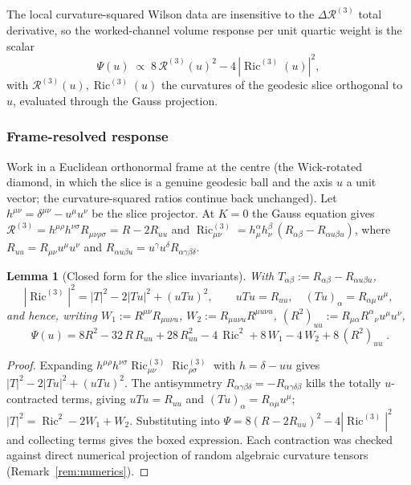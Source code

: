 \documentclass[11pt]{article}
\newtheorem{lemma}[theorem]{Lemma}
\theoremstyle{definition}
\theoremstyle{remark}
\newcommand{\Ric}{\operatorname{Ric}}
\newcommand{\Ruu}{R_{uu}}
\newcommand{\Rth}{\mathcal R^{(3)}}
\begin{document}
The local curvature-squared Wilson data are insensitive to the $\Delta\Rth$ total
derivative, so the worked-channel volume response per unit quartic weight is the
scalar
\begin{equation}
\label{eq:psi-def}
 \Psi(u)\;\propto\;8\,\Rth(u)^2-4\,|\Ric^{(3)}(u)|^2,
\end{equation}
with $\Rth(u),\Ric^{(3)}(u)$ the curvatures of the geodesic slice orthogonal to
$u$, evaluated through the Gauss projection.

\subsubsection{Frame-resolved response}
\label{subsec:worked-frame}

Work in a Euclidean orthonormal frame at the centre (the Wick-rotated diamond, in
which the slice is a genuine geodesic ball and the axis $u$ a unit vector; the
curvature-squared ratios continue back unchanged).  Let
$h^{\mu\nu}=\delta^{\mu\nu}-u^\mu u^\nu$ be the slice projector.  At $K=0$ the Gauss
equation gives $\Rth=h^{\mu\rho}h^{\nu\sigma}R_{\mu\nu\rho\sigma}=R-2\Ruu$ and
$\Ric^{(3)}_{\mu\nu}=h_\mu^\alpha h_\nu^\beta\,(R_{\alpha\beta}-R_{\alpha u\beta u})$,
where $\Ruu=R_{\mu\nu}u^\mu u^\nu$ and $R_{\alpha u\beta u}=u^\gamma u^\delta
R_{\alpha\gamma\beta\delta}$.

\begin{lemma}[Closed form for the slice invariants]
\label{lem:slice-closed}
With $T_{\alpha\beta}:=R_{\alpha\beta}-R_{\alpha u\beta u}$,
\[
 |\Ric^{(3)}|^2=|T|^2-2|Tu|^2+(uTu)^2,
 \qquad uTu=\Ruu,\quad (Tu)_\alpha=R_{\alpha\mu}u^\mu,
\]
and hence, writing $W_1:=R^{\mu\nu}R_{\mu u\nu u}$,
$W_2:=R_{\mu u\nu u}R^{\mu u\nu u}$, $(R^2)_{uu}:=R_{\mu\alpha}R^{\alpha}{}_{\nu}
u^\mu u^\nu$,
\[
 \boxed{\;
 \Psi(u)=8R^2-32\,R\,\Ruu+28\,\Ruu^2-4\,\Ric^2
 +8\,W_1-4\,W_2+8\,(R^2)_{uu}\; }.
\]
\end{lemma}

\begin{proof}
Expanding $h^{\mu\rho}h^{\nu\sigma}\Ric^{(3)}_{\mu\nu}\Ric^{(3)}_{\rho\sigma}$ with
$h=\delta-uu$ gives $|T|^2-2|Tu|^2+(uTu)^2$.  The antisymmetry
$R_{\alpha\gamma\beta\delta}=-R_{\alpha\gamma\delta\beta}$ kills the totally
$u$-contracted terms, giving $uTu=\Ruu$ and $(Tu)_\alpha=R_{\alpha\mu}u^\mu$;
$|T|^2=\Ric^2-2W_1+W_2$.  Substituting into
$\Psi=8(R-2\Ruu)^2-4|\Ric^{(3)}|^2$ and collecting terms gives the boxed
expression.  Each contraction was checked against direct numerical projection of
random algebraic curvature tensors (Remark~\ref{rem:numerics}).
\end{proof}
\end{document}
